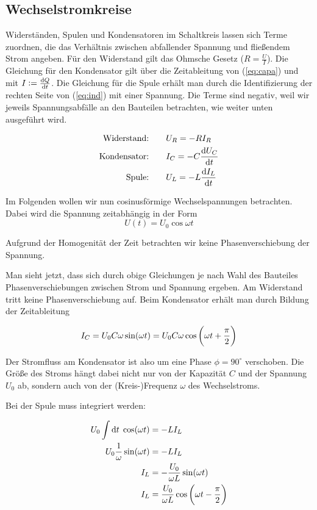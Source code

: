 \subsection{Wechselstromkreise}

Widerständen, Spulen und Kondensatoren im Schaltkreis lassen sich Terme
zuordnen, die das Verhältnis zwischen abfallender Spannung und fließendem Strom
angeben. Für den Widerstand gilt das Ohmsche Gesetz ($R = \frac{U}{I}$).  Die
Gleichung für den Kondensator gilt über die Zeitableitung von (\ref{eq:capa})
und mit $I := \frac{\dif Q}{\dif t}$. Die Gleichung für die Spule erhält man
durch die Identifizierung der rechten Seite von (\ref{eq:ind}) mit einer
Spannung. Die Terme sind negativ, weil wir jeweils Spannungsabfälle an den
Bauteilen betrachten, wie weiter unten ausgeführt wird.

\begin{align}
  \text{Widerstand:}  \qquad & U_R = -R I_R \\
  \text{Kondensator:} \qquad & I_C = -C \frac{\dif U_C}{\dif t} \\
  \text{Spule:}       \qquad & U_L = -L \frac{\dif I_L}{\dif t}
\end{align}

Im Folgenden wollen wir nun cosinusförmige Wechselspannungen betrachten. Dabei
wird die Spannung zeitabhängig in der Form
\begin{equation}
  U(t) = U_0 \cos \omega t
\end{equation}

Aufgrund der Homogenität der Zeit betrachten wir keine Phasenverschiebung der
Spannung.

Man sieht jetzt, dass sich durch obige Gleichungen je nach Wahl des Bauteiles
Phasenverschiebungen zwischen Strom und Spannung ergeben. Am Widerstand tritt
keine Phasenverschiebung auf. Beim Kondensator erhält man durch Bildung der
Zeitableitung

\begin{equation}
  I_C = U_0 C \omega \sin(\omega t) = U_0 C \omega \cos \del{\omega t + \frac{\pi}{2}}
\end{equation}

Der Stromfluss am Kondensator ist also um eine Phase $\phi = 90^\circ$
verschoben. Die Größe des Stroms hängt dabei nicht nur von der Kapazität $C$
und der Spannung $U_0$ ab, sondern auch von der (Kreis-)Frequenz $\omega$ des
Wechselstroms.

Bei der Spule muss integriert werden:

\begin{align}
  U_0 \int \dif t \; \cos(\omega t) &= -L I_L \\
  U_0 \frac{1}{\omega} \sin(\omega t) &= -L I_L \\
  I_L &= -\frac{U_0}{\omega L} \sin(\omega t) \\
  I_L &= \frac{U_0}{\omega L} \cos \del{\omega t - \frac{\pi}{2}}
\end{align}

